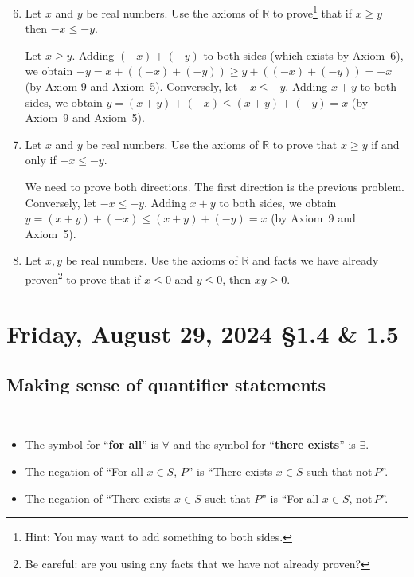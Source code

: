 \documentclass[12pt]{amsart}
\def\Fr{Friday}
\newcommand{\R}{{\mathbb{R}}}
\numberwithin{equation}{section}
\theoremstyle{plain} %
\newcommand{\Aug}[3]{\section{#2, August #1, 2024 \quad \S#3}}
\theoremstyle{definition}
\theoremstyle{remark}
\begin{document}
\begin{enumerate}\setcounter{enumi}{5}

\item Let $x$ and $y$ be real numbers. Use the axioms of $\R$ to prove\footnote{Hint: You may want to add something to both sides.} that if $x \geq y$ then $-x \leq -y$.


\begin{framed}
Let $x\geq y$. Adding $(-x) + (-y)$ to both sides (which exists by Axiom~6), we obtain $-y=x+((-x)+ (-y)) \geq y+((-x)+(-y)) = -x$ (by Axiom 9 and Axiom~5).
	Conversely, let $-x \leq -y$. Adding $x+y$ to both sides, we obtain $y=(x+y)+(-x) \leq (x+y)+(-y) = x$ (by Axiom~9 and Axiom~5).
	\end{framed}

\item Let $x$ and $y$ be real numbers. Use the axioms of $\R$ to prove that $x \geq y$ if and only if $-x \leq -y$.


\begin{framed}
We need to prove both directions. The first direction is the previous problem. Conversely, let $-x \leq -y$. Adding $x+y$ to both sides, we obtain $y=(x+y)+(-x) \leq (x+y)+(-y) = x$ (by Axiom~9 and Axiom~5).
\end{framed}

\item Let $x,y$ be real numbers. Use the axioms of $\R$ and facts we have already proven\footnote{Be careful: are you using any facts that we have not already proven?} to prove that if $x\leq 0$ and $y\leq 0$, then $xy\geq 0$. 






\end{enumerate}


\newpage

\Aug{29}{\Fr}{1.4 \& 1.5}



\subsection*{Making sense of quantifier statements} 

\

\begin{framed}
\begin{itemize}
\item The symbol for ``\textbf{for all}'' is $\forall$ and the symbol for ``\textbf{there exists}'' is $\exists$.
\item The negation of ``For all $x\in S$, $P$'' is ``There exists $x\in S$ such that $\mathrm{not} \, P$''.
\item The negation of ``There exists $x\in S$ such that $P$'' is ``For all $x\in S$, $\mathrm{not} \, P$''.
\end{itemize}
\end{framed}
\end{document}
